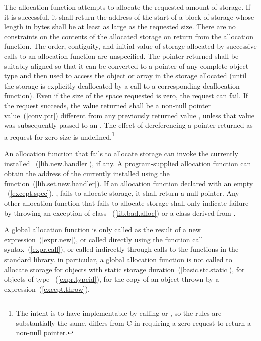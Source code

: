 \pnum
The allocation function attempts to allocate the requested amount of
storage. If it is successful, it shall return the address of the start
of a block of storage whose length in bytes shall be at least as large
as the requested size. There are no constraints on the contents of the
allocated storage on return from the allocation function. The order,
contiguity, and initial value of storage allocated by successive calls
to an allocation function are unspecified. The pointer returned shall be
suitably aligned so that it can be converted to a pointer of any
complete object type and then used to access the object or array in the
storage allocated (until the storage is explicitly deallocated by a call
to a corresponding deallocation function). Even if the size of the space
requested is zero, the request can fail. If the request succeeds, the
value returned shall be a non-null pointer value~(\ref{conv.ptr})
 different from any previously returned value ,
unless that value  was subsequently passed to an
 . The effect of dereferencing a pointer
returned as a request for zero size is undefined.\footnote{The intent is
to have  implementable by
calling  or , so the rules are
substantially the same. \Cpp differs from C in requiring a zero request
to return a non-null pointer.}

\pnum
An allocation function that fails to allocate storage can invoke the
currently installed ~(\ref{lib.new.handler}), if any.
\enternote
{}%
A program-supplied allocation function can obtain the address of the
currently installed  using the
 function~(\ref{lib.set.new.handler}). \exitnote
If an allocation function declared with an empty
~(\ref{except.spec}), ,
fails to allocate storage, it shall return a null pointer. Any other
allocation function that fails to allocate storage shall only indicate
failure by throwing an exception of class
~(\ref{lib.bad.alloc}) or a class derived from
.

\pnum
A global allocation function is only called as the result of a new
expression~(\ref{expr.new}), or called directly using the function call
syntax~(\ref{expr.call}), or called indirectly through calls to the
functions in the \Cpp standard library. \enternote in particular, a
global allocation function is not called to allocate storage for objects
with static storage duration~(\ref{basic.stc.static}), for objects of
type ~(\ref{expr.typeid}), for the copy of an
object thrown by a  expression~(\ref{except.throw}).
\exitnote

